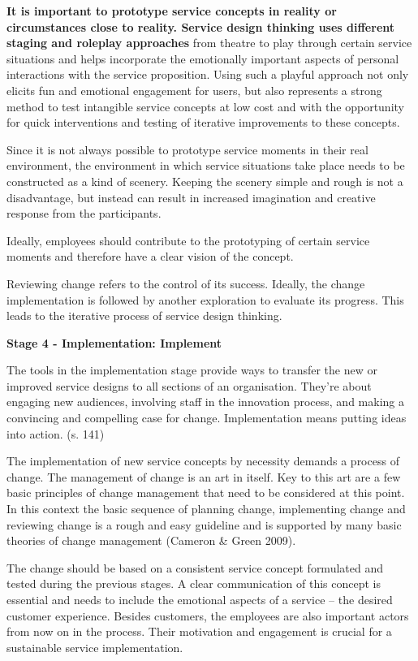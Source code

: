 \textbf{It is important to prototype service concepts in
reality or circumstances close to reality. Service design thinking uses different staging and roleplay approaches} from theatre to play through certain service situations and helps incorporate the emotionally important aspects of personal interactions with the service proposition. Using such a playful approach not only elicits fun and emotional engagement for users, but also represents a strong method to test intangible service concepts at low cost and with the opportunity for quick interventions and testing of iterative improvements to these concepts.

Since it is not always possible to prototype service moments in their real environment, the environment in which service situations take place needs to be constructed as a kind of scenery. Keeping the scenery simple and rough is not a disadvantage, but instead can result in increased imagination and creative response from the participants.

Ideally, employees should contribute to the prototyping of certain service moments and therefore have a clear vision of the concept.

Reviewing change refers to the control of its success. Ideally, the change implementation is followed by another exploration to evaluate its progress. This leads to the iterative process of service design thinking.

\textbf{Stage 4 - Implementation: Implement}

The tools in the implementation stage provide ways to transfer the new or improved service designs to all sections of an organisation. They’re about engaging new audiences, involving staff in the innovation process, and making a convincing and compelling case for change. Implementation means putting ideas into action. (s. 141)

The implementation of new service concepts by necessity demands a process of change. The management of change is an art in itself. Key to this art are a few basic principles of change management that need to be considered at this point. In this context the basic sequence of planning change, implementing change and reviewing change is a rough and easy guideline and is supported by many basic theories of change management (Cameron \& Green 2009).

The change should be based on a consistent service concept formulated and tested during the previous stages. A clear communication of this concept is essential and needs to include the emotional aspects of a service – the desired customer experience. Besides customers, the employees are also important actors from now on in the process. Their motivation and engagement is crucial for a sustainable service implementation.

